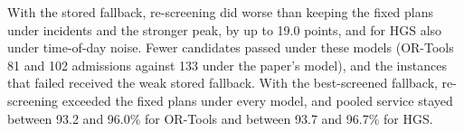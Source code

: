 With the stored fallback, re-screening did worse than keeping the fixed plans under incidents and the stronger peak, by up to 19.0 points, and for HGS also under time-of-day noise. Fewer candidates passed under these models (OR-Tools 81 and 102 admissions against 133 under the paper's model), and the instances that failed received the weak stored fallback. With the best-screened fallback, re-screening exceeded the fixed plans under every model, and pooled service stayed between 93.2 and 96.0\% for OR-Tools and between 93.7 and 96.7\% for HGS.
